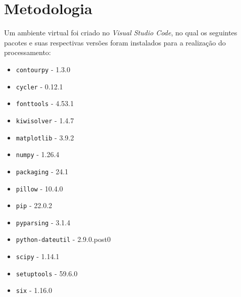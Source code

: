 \section{Metodologia}

Um ambiente virtual foi criado no \textit{Visual Studio Code}, no qual os seguintes pacotes e suas respectivas versões foram instalados para a realização do processamento:
\begin{itemize}
    \item \texttt{contourpy} - 1.3.0
    \item \texttt{cycler} - 0.12.1
    \item \texttt{fonttools} - 4.53.1
    \item \texttt{kiwisolver} - 1.4.7
    \item \texttt{matplotlib} - 3.9.2
    \item \texttt{numpy} - 1.26.4
    \item \texttt{packaging} - 24.1
    \item \texttt{pillow} - 10.4.0
    \item \texttt{pip} - 22.0.2
    \item \texttt{pyparsing} - 3.1.4
    \item \texttt{python-dateutil} - 2.9.0.post0
    \item \texttt{scipy} - 1.14.1
    \item \texttt{setuptools} - 59.6.0
    \item \texttt{six} - 1.16.0
\end{itemize}